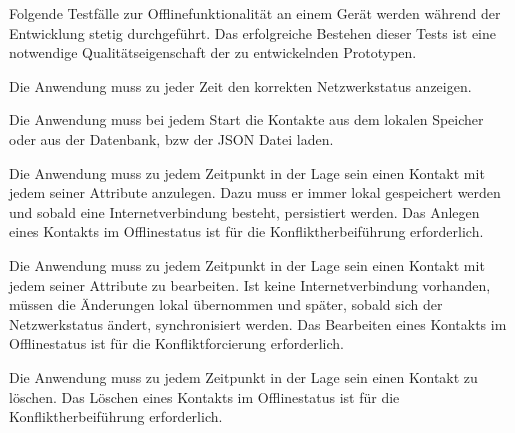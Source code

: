 Folgende Testfälle zur Offlinefunktionalität an einem Gerät werden während der Entwicklung stetig durchgeführt.
Das erfolgreiche Bestehen dieser Tests ist eine notwendige Qualitätseigenschaft der zu entwickelnden Prototypen.
\begin{description}[leftmargin=0.7cm,style=nextline]
\item[Netzwerkstatus:] 
Die Anwendung muss zu jeder Zeit den korrekten Netzwerkstatus anzeigen.\\
\item[Kontakte lesen:] 
Die Anwendung muss bei jedem Start die Kontakte aus dem lokalen Speicher oder aus der Datenbank, bzw der \gls{JSON} Datei laden.\\
\item[Kontakt anlegen:] 
Die Anwendung muss zu jedem Zeitpunkt in der Lage sein einen Kontakt mit jedem seiner Attribute anzulegen.
Dazu muss er immer lokal gespeichert werden und sobald eine Internetverbindung besteht, persistiert werden.
Das Anlegen eines Kontakts im Offlinestatus ist für die Konfliktherbeiführung erforderlich.\\
\item[Kontakt bearbeiten:] 
Die Anwendung muss zu jedem Zeitpunkt in der Lage sein einen Kontakt mit jedem seiner Attribute zu bearbeiten.
Ist keine Internetverbindung vorhanden, müssen die Änderungen lokal übernommen und später, sobald sich der Netzwerkstatus ändert, synchronisiert werden.
Das Bearbeiten eines Kontakts im Offlinestatus ist für die Konfliktforcierung erforderlich.\\
\item[Kontakt löschen:] 
Die Anwendung muss zu jedem Zeitpunkt in der Lage sein einen Kontakt zu löschen.
Das Löschen eines Kontakts im Offlinestatus ist für die Konfliktherbeiführung erforderlich.
\end{description}